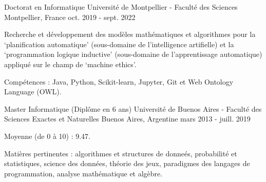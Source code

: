 

\begin{cventries}

  \cventry
    {Doctorat en Informatique}
    {Université de Montpellier - Faculté des Sciences}
    {Montpellier, France}
    {oct. 2019 - sept. 2022}
    {
      \begin{cvitems}
        \item Recherche et développement des modèles mathématiques et algorithmes pour la `planification automatique' (sous-domaine de l'intelligence artifielle) et la `programmation logique inductive' (sous-domaine de l'apprentissage automatique) appliqué sur le champ de `machine ethics'.
        \item Compétences : Java, Python, Scikit-learn, Jupyter, Git et Web Ontology Language (OWL).
      \end{cvitems}
    }  

  \cventry
  {Master Informatique (Diplôme en 6 ans)}
  {Université de Buenos Aires - Faculté des Sciences Exactes et Naturelles}
  {Buenos Aires, Argentine}
  {mars 2013 - juill. 2019}
  {
    \begin{cvitems}
      \item Moyenne (de 0 à 10) : 9.47.
      \item Matières pertinentes : algorithmes et structures de donneés, probabilité et statistiques, science des données, théorie des jeux, paradigmes des langages de programmation, analyse mathématique et algèbre.
    \end{cvitems}
  }  

\end{cventries}
